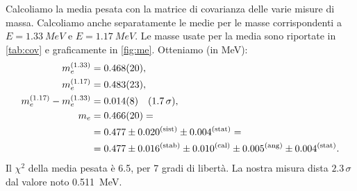 Calcoliamo la media pesata con la matrice di covarianza delle varie misure di massa.
Calcoliamo anche separatamente le medie per le masse corrispondenti a $E=\SI{1.33}{MeV}$ e $E=\SI{1.17}{MeV}$.
Le masse usate per la media sono riportate in \autoref{tab:cov} e graficamente in \autoref{fig:me}.
Otteniamo (in \si{MeV}):
\begin{align*}
	m_e^{(1.33)}                &= \num{0.468 \pm 0.020}  ,    \\
	m_e^{(1.17)}                &= \num{0.483 \pm 0.023}  ,    \\
	m_e^{(1.17)} - m_e^{(1.33)} &= \num{0.014 \pm 0.008}  \quad(1.7\,\sigma),   \\
	m_e                         &= \num{0.466 \pm 0.020} = \\
	                            &=      0.477 \pm 0.020^{(\text{sist})} \pm 0.004^{(\text{stat})} = \\
										 &=      0.477 \pm 0.016^{(\text{stab})} \pm 0.010^{(\text{cal})} \pm 0.005^{(\text{ang})} \pm 0.004^{(\text{stat})}.
\end{align*}
Il $\chi^2$ della media pesata è 6.5, per 7 gradi di libertà.
La nostra misura dista $2.3\,\sigma$ dal valore noto \SI{0.511}{MeV}.
